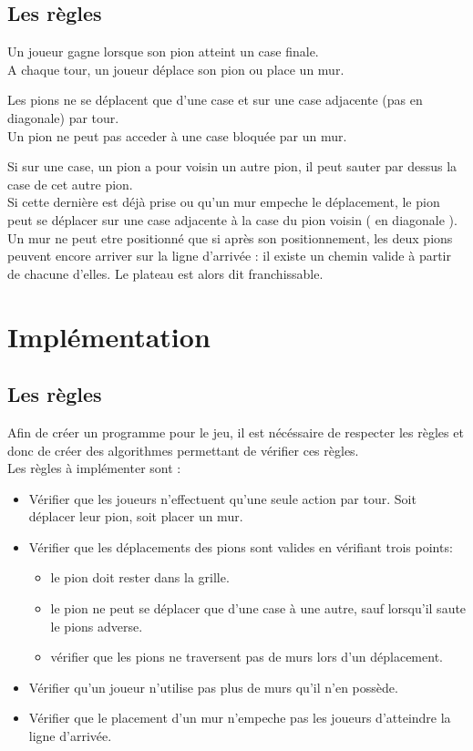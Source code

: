\documentclass[a4paper, draft]{article}
\begin{document}
\subsection{Les règles}

Un joueur gagne lorsque son pion atteint un case finale.\\
A chaque tour, un joueur déplace son pion ou place un mur.

Les pions ne se déplacent que d'une case et sur une case adjacente (pas en diagonale) par tour.\\
Un pion ne peut pas acceder à une case bloquée par un mur.

Si sur une case, un pion a pour voisin un autre pion, il peut sauter par dessus la case de cet autre pion. \\
Si cette dernière est déjà prise ou qu'un mur empeche le déplacement, le pion peut se déplacer sur une case adjacente à la case du pion voisin ( en diagonale ).\\
Un mur ne peut etre positionné que si après son positionnement, les deux pions peuvent encore arriver sur la ligne d'arrivée : il existe un chemin valide à partir de chacune d'elles. Le plateau est alors dit franchissable.

\section{Implémentation}
\subsection{Les règles}
Afin de créer un programme pour le jeu, il est nécéssaire de respecter les règles et donc de créer des algorithmes permettant de vérifier ces règles.\\
Les règles à implémenter sont :
\begin{itemize}

  \item Vérifier que les joueurs n'effectuent qu'une seule action par tour. Soit déplacer leur pion, soit placer un mur.
  \item Vérifier que les déplacements des pions sont valides en vérifiant trois points:
      \begin{itemize}
        \item le pion doit rester dans la grille.
        \item le pion ne peut se déplacer que d'une case à une autre, sauf lorsqu'il saute le pions adverse.
        \item vérifier que les pions ne traversent pas de murs lors d'un déplacement.
      \end{itemize}
      \item Vérifier qu'un joueur n'utilise pas plus de murs qu'il n'en possède.
      \item Vérifier que le placement d'un mur n'empeche pas les joueurs d'atteindre la ligne d'arrivée.
      

\end{itemize}
\end{document}
